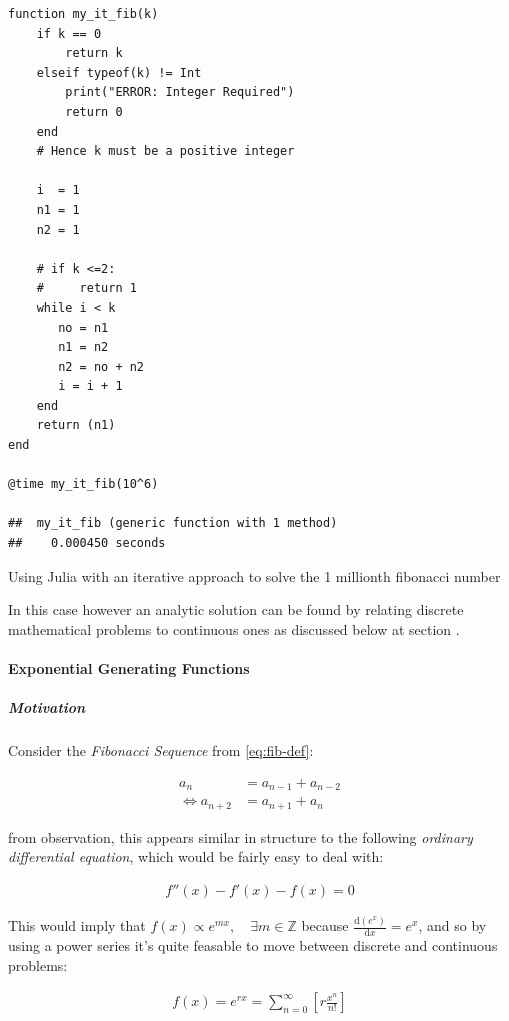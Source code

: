 \documentclass[11pt]{article}
\begin{document}
\begin{listing}[htbp]
\begin{verbatim}
function my_it_fib(k)
    if k == 0
        return k
    elseif typeof(k) != Int
        print("ERROR: Integer Required")
        return 0
    end
    # Hence k must be a positive integer

    i  = 1
    n1 = 1
    n2 = 1

    # if k <=2:
    #     return 1
    while i < k
       no = n1
       n1 = n2
       n2 = no + n2
       i = i + 1
    end
    return (n1)
end

@time my_it_fib(10^6)

##  my_it_fib (generic function with 1 method)
##    0.000450 seconds
\end{verbatim}
\caption{\label{julia-fib}Using Julia with an iterative approach to solve the 1 millionth fibonacci number}
\end{listing}

In this case however an analytic solution can be found by relating discrete
mathematical problems to continuous ones as discussed below at section .
\paragraph{Exponential Generating Functions}
\label{exp-gen-func-fib-seq}
\subparagraph{Motivation}
\label{motivation}
Consider the \emph{Fibonacci Sequence} from \eqref{eq:fib-def}:


\begin{align}
    a_{n}&= a_{n - 1} + a_{n - 2} \nonumber \\
\iff a_{n+  2} &= a_{n+  1} +  a_n \label{eq:fib-def-shift}
\end{align}


from observation, this appears similar in structure to the following \emph{ordinary
differential equation}, which would be fairly easy to deal with:


\begin{align*}
f''\left( x \right)- f'\left( x \right)- f\left( x \right)=  0
\end{align*}


This would imply that \(f\left( x \right) \propto e^{mx}, \quad \exists m \in \mathbb{Z}\) because
\(\frac{\mathrm{d}\left( e^x \right) }{\mathrm{d} x} = e^x\), and so by using a power series it's quite feasable to move between discrete and continuous problems:


\begin{align*}
f\left( x \right)= e^{rx} = \sum^{\infty}_{n= 0}   \left[ r \frac{x^n}{n!} \right]
\end{align*}
\end{document}
